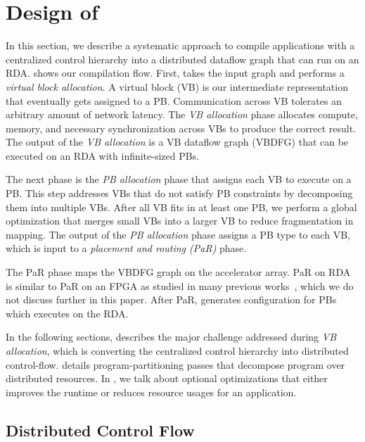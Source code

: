 \section{Design of \name}
\label{sec:compiler}
In this section, we describe a systematic approach to compile applications with a centralized control hierarchy into a distributed dataflow graph that can run on an RDA.
 shows our compilation flow.
First, \name{} takes the input graph and performs a {\em virtual block allocation}.
A virtual block (VB) is our intermediate representation that eventually gets assigned to a PB.
Communication across VB tolerates an arbitrary amount of network latency.
The {\em VB allocation} phase allocates compute, memory, and necessary synchronization across VBs to produce the correct result.
The output of the {\em VB allocation} is a VB dataflow graph (VBDFG) that can be executed on an RDA with infinite-sized PBs.

The next phase is the {\em PB allocation} phase that assigns each VB to execute on a PB. 
This step addresses VBs that do not satisfy PB constraints by decomposing them into multiple VBs.
After all VB fits in at least one PB, we perform a global optimization that merges 
small VBs into a larger VB to reduce fragmentation in mapping.
The output of the {\em PB allocation} phase assigns a PB type to each VB, which is input to a {\em placement and routing (PaR)} phase.

The PaR phase maps the VBDFG graph on the accelerator array.
PaR on RDA is similar to PaR on an FPGA as studied in many previous works~\cite{network}, which we do not discuss further in this paper. 
After PaR, \name{} generates configuration for PBs which executes on the RDA.

In the following sections,  describes the major challenge addressed during {\em VB allocation}, which is converting the centralized control hierarchy into distributed control-flow.
 details program-partitioning passes that decompose program over distributed resources.
In , we talk about optional optimizations that either improves the runtime or reduces resource usages for an application.

\subsection{Distributed Control Flow}
\label{sec:control}

